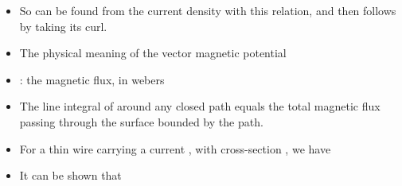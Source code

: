 \begin{ELjoin}

\begin{itemize}
\tightlist
\item
  So  can be found from the current density with this relation, and  then follows by taking its curl.
\item
  The physical meaning of the vector magnetic potential
\end{itemize}


\begin{itemize}
\tightlist
\item
  \ELim{\Phi}: the magnetic flux, in webers
\end{itemize}

\begin{ELimportant}{}


\end{ELimportant}

\end{ELjoin}

\begin{ELunit}

\begin{itemize}
\tightlist
\item
  The line integral of  around any closed path  equals the total magnetic flux passing through the surface bounded by the path.
\end{itemize}

\end{ELunit}

\ELhold


\begin{ELunit}


\begin{itemize}
\tightlist
\item
  For a thin wire carrying a current , with cross-section , we have
\end{itemize}


\begin{itemize}
\tightlist
\item
  It can be shown that
\end{itemize}


\end{ELunit}

